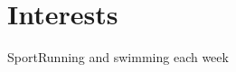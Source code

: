 \documentclass[10pt,a4paper,sans]{moderncv}   %
\begin{document}
\section{Interests}
						{Sport}{Running and swimming each week}
						


%

\end{document}

